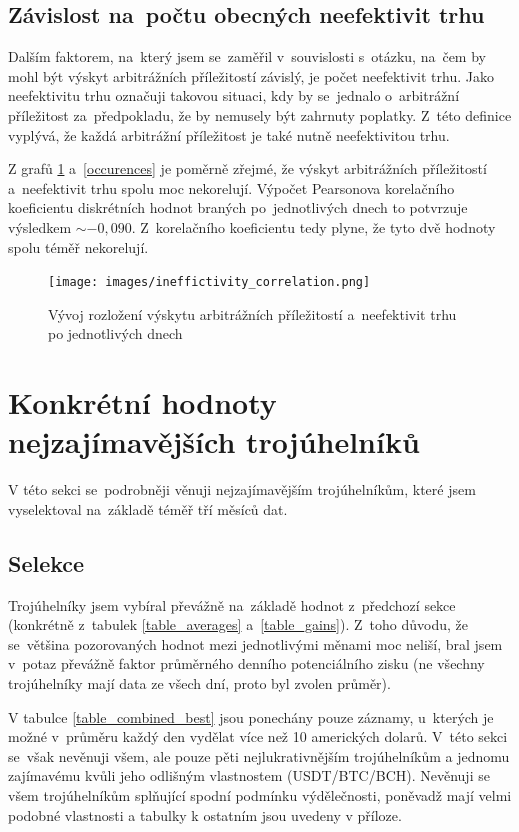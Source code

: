 \documentclass[thesis=B,czech]{FITthesis}[2019/03/21]
\begin{document}
\subsection{Závislost na~počtu obecných neefektivit trhu}
Dalším faktorem, na~který jsem se~zaměřil v~souvislosti s~otázku, na~čem by mohl být výskyt arbitrážních příležitostí závislý, je počet neefektivit trhu. Jako neefektivitu trhu označuji takovou situaci, kdy by se~jednalo o~arbitrážní příležitost za~předpokladu, že by nemusely být zahrnuty poplatky. Z~této definice vyplývá, že každá arbitrážní příležitost je také nutně neefektivitou trhu.

Z grafů \ref{ineffictivity_correlation} a~\ref{occurences} je poměrně zřejmé, že výskyt arbitrážních příležitostí a~neefektivit trhu spolu moc nekorelují. Výpočet Pearsonova korelačního koeficientu diskrétních hodnot braných po~jednotlivých dnech to potvrzuje výsledkem \(\sim-0,090\). Z~korelačního koeficientu tedy plyne, že tyto dvě hodnoty spolu téměř nekorelují.

\begin{figure}\centering
	\texttt{[image: images/ineffictivity\_correlation.png]}
	\caption{Vývoj rozložení výskytu arbitrážních příležitostí a~neefektivit trhu po jednotlivých dnech}
	\label{ineffictivity_correlation}
\end{figure}

\section{Konkrétní hodnoty nejzajímavějších trojúhelníků}
V této sekci se~podrobněji věnuji nejzajímavějším trojúhelníkům, které jsem vyselektoval na~základě téměř tří měsíců dat. 

\subsection{Selekce}
Trojúhelníky jsem vybíral převážně na~základě hodnot z~předchozí sekce \linebreak (konkrétně z~tabulek \ref{table_averages} a~\ref{table_gains}). Z~toho důvodu, že se~většina pozorovaných hodnot mezi jednotlivými měnami moc neliší, bral jsem v~potaz převážně faktor průměrného denního potenciálního zisku (ne všechny trojúhelníky mají data ze všech dní, proto byl zvolen průměr).

V tabulce \ref{table_combined_best} jsou ponechány pouze záznamy, u~kterých je možné v~průměru každý den vydělat více než 10 amerických dolarů. V~této sekci se~však nevěnuji všem, ale pouze pěti nejlukrativnějším trojúhelníkům a jednomu zajímavému kvůli jeho odlišným vlastnostem (USDT/BTC/BCH). Nevěnuji se všem trojúhelníkům splňující spodní podmínku výdělečnosti, poněvadž mají velmi podobné vlastnosti a tabulky k ostatním jsou uvedeny v příloze.
\end{document}
